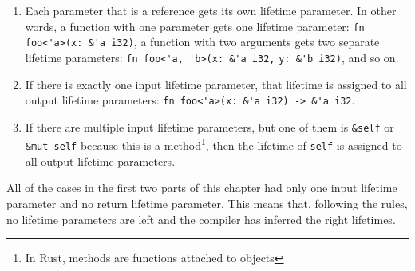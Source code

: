 \begin{enumerate}[noitemsep]
    \item Each parameter that is a reference gets its own lifetime parameter. In other words, a function with one parameter gets one lifetime parameter: \verb|fn foo<'a>(x: &'a i32)|, a function with two arguments gets two separate lifetime parameters: \verb|fn foo<'a, 'b>(x: &'a i32,| \verb|y: &'b i32)|, and so on.
\item If there is exactly one input lifetime parameter, that lifetime is assigned to all output lifetime parameters: \verb|fn foo<'a>(x: &'a i32) -> &'a i32|.
\item If there are multiple input lifetime parameters, but one of them is \verb|&self| or \verb|&mut self| because this is a method\footnote{In Rust, methods are functions attached to objects}, then the lifetime of \verb|self| is assigned to all output lifetime parameters.
\end{enumerate}

All of the cases in the first two parts of this chapter had only one input lifetime parameter and no return lifetime parameter. This means that, following the rules, no lifetime parameters are left and the compiler has inferred the right lifetimes. 



%    

